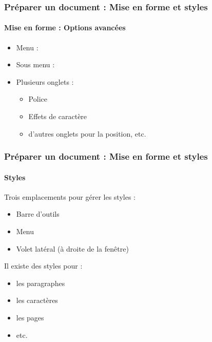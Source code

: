 \documentclass[xcolor=table]{beamer}
\begin{document}
\begin{frame}
\frametitle{Préparer un document : Mise en forme et styles}
\framesubtitle{Mise en forme : Options avancées}

\begin{minipage}{0.39\textwidth}
\begin{itemize}
	\item Menu :  
	\item Sous menu : 
	\item Plusieurs onglets : 
	\begin{itemize}
		\item Police
		\item Effets de caractère
		\item d'autres onglets pour la position, etc.
	\end{itemize}
\end{itemize}
\end{minipage}
\begin{minipage}{0.60\textwidth}
	
\end{minipage}

\end{frame}


\begin{frame}
\frametitle{Préparer un document : Mise en forme et styles}
\framesubtitle{Styles}

\begin{minipage}{0.69\textwidth}
	Trois emplacements pour gérer les styles : 
	\begin{itemize}
		\item Barre d'outils
		\item Menu  
		\item Volet latéral (à droite de la fenêtre)
	\end{itemize}

	\vspace{12pt}

	Il existe des styles pour : 
	\begin{itemize}
		\item les paragraphes
		\item les caractères 
		\item les pages
		\item etc.
	\end{itemize}
\end{minipage}
\begin{minipage}{0.30\textwidth}
	
	\vspace{6pt} 
	
\end{minipage}

\end{frame}
\end{document}
